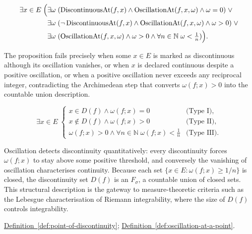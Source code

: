 \begin{remark*}
\[
\begin{aligned}
\exists x\in E\;\Bigl(
&\exists \omega\;(\operatorname{DiscontinuousAt}(f,x)\land \operatorname{OscillationAt}(f,x,\omega)\land \omega=0)\;\lor\\
&\exists \omega\;(\neg\operatorname{DiscontinuousAt}(f,x)\land \operatorname{OscillationAt}(f,x,\omega)\land \omega>0)\;\lor\\
&\exists \omega\;(\operatorname{OscillationAt}(f,x,\omega)\land \omega>0\land \forall n\in\mathbb{N}\; \omega<\tfrac1n)
\Bigr).
\end{aligned}
\]
\end{remark*}

\begin{remark*}
The proposition fails precisely when some $x\in E$ is marked as discontinuous although its oscillation vanishes, or when $x$ is declared continuous despite a positive oscillation, or when a positive oscillation never exceeds any reciprocal integer, contradicting the Archimedean step that converts $\omega(f;x)>0$ into the countable union description.
\end{remark*}

\begin{remark*}
\[
\exists x\in E\;
\begin{cases}
x\in D(f)\land \omega(f;x)=0 & \text{(Type I)},\\[4pt]
x\notin D(f)\land \omega(f;x)>0 & \text{(Type II)},\\[4pt]
\omega(f;x)>0\land \forall n\in\mathbb{N}\; \omega(f;x)<\tfrac1n & \text{(Type III)}.
\end{cases}
\]
\end{remark*}

\begin{remark*}[Interpretation]
Oscillation detects discontinuity quantitatively: every discontinuity forces $\omega(f;x)$ to stay above some positive threshold, and conversely the vanishing of oscillation characterises continuity. Because each set $\{x\in E:\omega(f;x)\ge 1/n\}$ is closed, the discontinuity set $D(f)$ is an $F_{\sigma}$, a countable union of closed sets. This structural description is the gateway to measure-theoretic criteria such as the Lebesgue characterisation of Riemann integrability, where the size of $D(f)$ controls integrability.
\end{remark*}

\begin{remark*}[Dependencies]
\hyperref[def:point-of-discontinuity]{Definition~\ref*{def:point-of-discontinuity}};
\hyperref[def:oscillation-at-a-point]{Definition~\ref*{def:oscillation-at-a-point}}.
\end{remark*}
